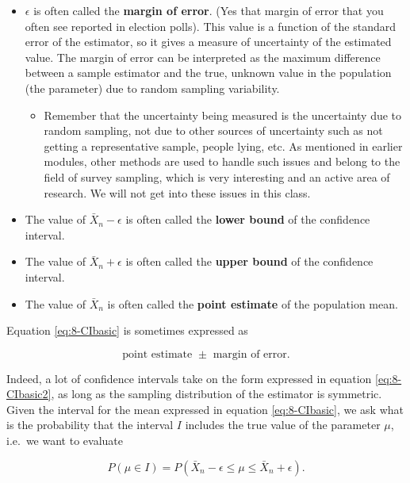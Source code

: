\documentclass[
]{book}
\providecommand{\tightlist}{%
  \setlength{\itemsep}{0pt}\setlength{\parskip}{0pt}}
\theoremstyle{definition}
\theoremstyle{definition}
\theoremstyle{definition}
\theoremstyle{definition}
\theoremstyle{remark}
\begin{document}
\begin{itemize}
\item
  \(\epsilon\) is often called the \textbf{margin of error}. (Yes that margin of error that you often see reported in election polls). This value is a function of the standard error of the estimator, so it gives a measure of uncertainty of the estimated value. The margin of error can be interpreted as the maximum difference between a sample estimator and the true, unknown value in the population (the parameter) due to random sampling variability.

  \begin{itemize}
  \tightlist
  \item
    Remember that the uncertainty being measured is the uncertainty due to random sampling, not due to other sources of uncertainty such as not getting a representative sample, people lying, etc. As mentioned in earlier modules, other methods are used to handle such issues and belong to the field of survey sampling, which is very interesting and an active area of research. We will not get into these issues in this class.
  \end{itemize}
\item
  The value of \(\bar{X}_n - \epsilon\) is often called the \textbf{lower bound} of the confidence interval.
\item
  The value of \(\bar{X}_n + \epsilon\) is often called the \textbf{upper bound} of the confidence interval.
\item
  The value of \(\bar{X}_n\) is often called the \textbf{point estimate} of the population mean.
\end{itemize}

Equation \eqref{eq:8-CIbasic} is sometimes expressed as

\begin{equation} 
\text{point estimate } \pm \text{ margin of error}.
\label{eq:8-CIbasic2}
\end{equation}

Indeed, a lot of confidence intervals take on the form expressed in equation \eqref{eq:8-CIbasic2}, as long as the sampling distribution of the estimator is symmetric. Given the interval for the mean expressed in equation \eqref{eq:8-CIbasic}, we ask what is the probability that the interval \(I\) includes the true value of the parameter \(\mu\), i.e.~we want to evaluate

\begin{equation} 
P(\mu \in  I) = P(\bar{X}_n - \epsilon \leq \mu \leq \bar{X}_n + \epsilon).
\label{eq:8-CIprob}
\end{equation}
\end{document}
